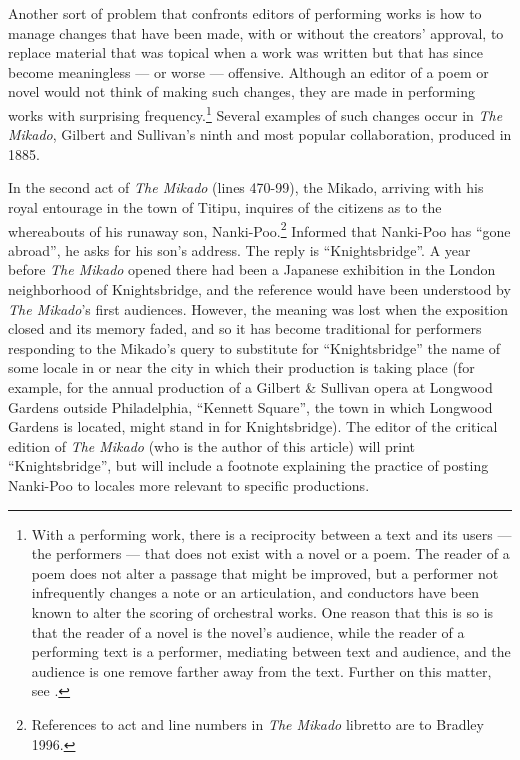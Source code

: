 \begin{paper}
Another sort of problem that confronts editors of performing works is
how to manage changes that have been made, with or without the creators'
approval, to replace material that was topical when a work was written
but that has since become meaningless --- or worse --- offensive. Although
an editor of a poem or novel would not think of making such changes,
they are made in performing works with surprising frequency.\footnote{With
  a performing work, there is a reciprocity between a text and its
  users --- the performers --- that does not exist with a novel or a poem.
  The reader of a poem does not alter a passage that might be improved,
  but a performer not infrequently changes a note or an articulation,
  and conductors have been known to alter the scoring of orchestral
  works. One reason that this is so is that the reader of a novel is the
  novel's audience, while the reader of a performing text is a
  performer, mediating between text and audience, and the audience is
  one remove farther away from the text. Further on this matter, see \citealt[24--33]{broude_performance_2011}.} Several examples of such changes occur in
\emph{The Mikado}, Gilbert and Sullivan's ninth and most popular
collaboration, produced in 1885.

In the second act of \emph{The Mikado} (lines 470-99), the Mikado,
arriving with his royal entourage in the town of Titipu, inquires of the
citizens as to the whereabouts of his runaway son, Nanki-Poo.\footnote{References
  to act and line numbers in \emph{The Mikado} libretto are to Bradley
  1996.} Informed that Nanki-Poo has ``gone abroad'', he asks for his
son's address. The reply is ``Knightsbridge''. A year before \emph{The
Mikado} opened there had been a Japanese exhibition in the London
neighborhood of Knightsbridge, and the reference would have been
understood by \emph{The Mikado}'s first audiences. However, the meaning
was lost when the exposition closed and its memory faded, and so it has
become traditional for performers responding to the Mikado's query to
substitute for ``Knightsbridge'' the name of some locale in or near the
city in which their production is taking place (for example, for the
annual production of a Gilbert \& Sullivan opera at Longwood Gardens
outside Philadelphia, ``Kennett Square'', the town in which Longwood
Gardens is located, might stand in for Knightsbridge). The editor of the
critical edition of \emph{The Mikado} (who is the author of this
article) will print ``Knightsbridge'', but will include a footnote
explaining the practice of posting Nanki-Poo to locales more relevant to
specific productions.


\end{paper}
